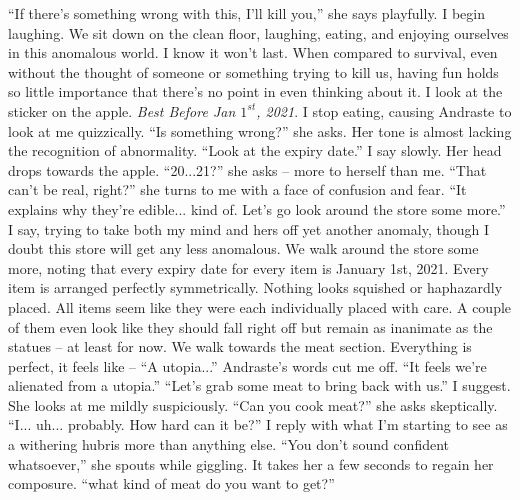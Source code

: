 \documentclass[a4paper, 12pt]{book}
\newcommand\tab[1][1cm]{\hspace*{#1}}
\begin{document}
\newline
\tab
``If there’s something wrong with this, I’ll kill you,'' she says playfully. I begin laughing. We sit down on the clean floor, laughing, eating, and enjoying ourselves in this anomalous world. I know it won’t last. When compared to survival, even without the thought of someone or something trying to kill us, having fun holds so little importance that there’s no point in even thinking about it.
\newline
\tab
I look at the sticker on the apple. \textit{Best Before Jan $1^{st}$, 2021}. I stop eating, causing Andraste to look at me quizzically. ``Is something wrong?'' she asks. Her tone is almost lacking the recognition of abnormality.
\newline
\tab
``Look at the expiry date.'' I say slowly.
\newline
\tab
Her head drops towards the apple. ``20...21?'' she asks -- more to herself than me. ``That can’t be real, right?'' she turns to me with a face of confusion and fear.
\newline
\tab
``It explains why they’re edible... kind of. Let’s go look around the store some more.'' I say, trying to take both my mind and hers off yet another anomaly, though I doubt this store will get any less anomalous. 
\newline
\tab
We walk around the store some more, noting that every expiry date for every item is January 1st, 2021. Every item is arranged perfectly symmetrically. Nothing looks squished or haphazardly placed. All items seem like they were each individually placed with care. A couple of them even look like they should fall right off but remain as inanimate as the statues -- at least for now. We walk towards the meat section. Everything is perfect, it feels like -- ``A utopia...'' Andraste’s words cut me off. ``It feels we’re alienated from a utopia.''
\newline
\tab
``Let’s grab some meat to bring back with us.'' I suggest.
\newline
\tab
She looks at me mildly suspiciously. ``Can you cook meat?'' she asks skeptically.
\newline
\tab
``I... uh... probably. How hard can it be?'' I reply with what I’m starting to see as a withering hubris more than anything else.
\newline
\tab
``You don’t sound confident whatsoever,'' she spouts while giggling. It takes her a few seconds to regain her composure. ``what kind of meat do you want to get?''
\newline
\end{document}
